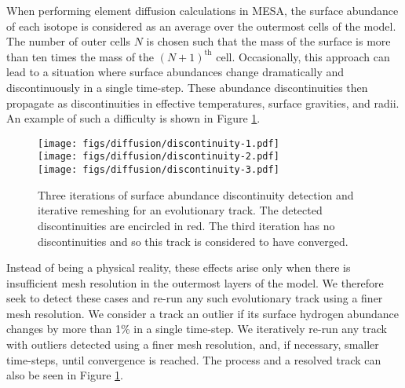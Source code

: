 \documentclass[twocolumn,twocolappendix]{aastex6}
\newcommand{\colwidth}{\linewidth}
\newif\ifref
\newcommand{\mb}[1]{\ifref\boldmath\textbf{#1}\unboldmath\else #1\fi}
\begin{document}
When performing element diffusion calculations in MESA, the surface abundance of each isotope is considered as an average over the outermost cells of the model. The number of outer cells $N$ is chosen such that the mass of the surface is more than ten times the mass of the $(N+1)^{\text{th}}$ cell. Occasionally, this approach can lead to a situation where surface abundances change dramatically and discontinuously in a single time-step. These abundance discontinuities then propagate as discontinuities in effective temperatures, surface gravities, and radii. An example of such a difficulty \mb{is shown} in Figure \ref{fig:discontinuity}. 

\begin{figure}
    \centering
    \texttt{[image: figs/diffusion/discontinuity-1.pdf]}\\
    \texttt{[image: figs/diffusion/discontinuity-2.pdf]}\\
    \texttt{[image: figs/diffusion/discontinuity-3.pdf]}\\
    \caption{Three iterations of surface abundance discontinuity detection and iterative remeshing for an evolutionary track. The detected discontinuities are encircled in red. The third iteration has no discontinuities and so this track is considered to have converged. \vspace*{5mm} \label{fig:discontinuity} }
\end{figure}

Instead of being a physical reality, these effects arise only when there is insufficient mesh resolution in the outermost layers of the model. We therefore seek to detect these cases and re-run any such evolutionary track using a finer mesh resolution. We consider a track an outlier if its surface hydrogen abundance changes by more than 1\% in a single time-step. We iteratively re-run any track with outliers detected using a finer mesh resolution, and, if necessary, smaller time-steps, until convergence is reached. The process and a resolved track can also be seen in Figure \ref{fig:discontinuity}. 
\end{document}
